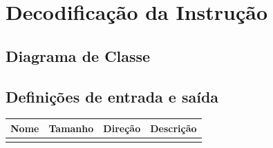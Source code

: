 ﻿\section{Decodificação da Instrução}
	\subsection{Diagrama de Classe}
  \begin{figure}[htpb!]
    
  \end{figure}
		
		\subsection{Definições de entrada e saída}
		
	\begin{center}
		\begin{longtable}[pos]{| l | c | c | m{7cm} |} \hline
			\multicolumn{1}{|c|}{\cellcolor[gray]{0.9}\textbf{Nome}} & 
			\multicolumn{1}{c|}{\cellcolor[gray]{0.9}\textbf{Tamanho}} & 
			\multicolumn{1}{c|}{\cellcolor[gray]{0.9}\textbf{Direção}} &
			\multicolumn{1}{c|}{\cellcolor[gray]{0.9}\textbf{Descrição}} \\ \hline
			\endhead
			\hline
			\endlastfoot
			

\end{longtable}
\end{center}
